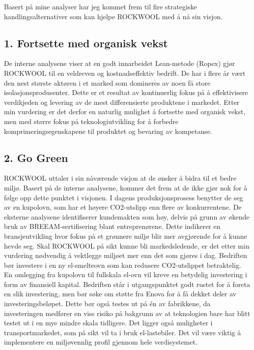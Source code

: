 Basert på mine analyser har jeg kommet frem til fire strategiske handlingsalternativer som kan hjelpe ROCKWOOL med å nå sin visjon.

\subsection*{1. Fortsette med organisk vekst}
De interne analysene viser at en godt innarbeidet Lean-metode (Ropex) gjør ROCKWOOL til en veldreven og kostnadseffektiv bedrift. De har i flere år vært den nest største aktøren i et marked som domineres av noen få store isolasjonsprodusenter. Dette er et resultat av kontinuerlig fokus på å effektivisere verdikjeden og levering av de mest differensierte produktene i markedet. Etter min vurdering er det derfor en naturlig mulighet å fortsette med organisk vekst, men med større fokus på teknologiutvikling for å forbedre komprimeringsegenskapene til produktet og bevaring av kompetanse.

\subsection*{2. Go Green}
ROCKWOOL uttaler i sin nåværende visjon at de ønsker å bidra til et bedre miljø. Basert på de interne analysene, kommer det frem at de ikke gjør nok for å følge opp dette punktet i visjonen. I dagens produksjonsprosess benytter de seg av en kupolovn, som har et høyere CO2-utslipp enn flere av konkurrentene. De eksterne analysene identifiserer kundemakten som høy, delvis på grunn av økende bruk av BREEAM-sertifisering blant entreprenørene. Dette indikerer en bransjeutvikling hvor fokus på et grønnere miljø blir mer avgjørende for å kunne hevde seg. Skal ROCKWOOL på sikt kunne bli markedsledende, er det etter min vurdering nødvendig å vektlegge miljøet mer enn det som gjøres i dag. Bedriften bør investere i en ny el-smelteovn som kan redusere CO2-utslippet betraktelig. En omlegging fra kupolovn til fullskala el-ovn vil kreve en betydelig investering i form av finansiell kapital. Bedriften står i utgangspunktet godt rustet for å foreta en slik investering, men bør søke om støtte fra Enova for å få dekket deler av investeringsbeløpet. Dette bør også testes ut på én av fabrikkene, da investeringen medfører en viss risiko på bakgrunn av at teknologien bare har blitt testet ut i en mye mindre skala tidligere.  Det ligger også muligheter i transportmarkedet, som på sikt vil ta i bruk el-lastebiler. Det vil være viktig å implementere en miljøvennlig profil gjennom hele verdisystemet.  

